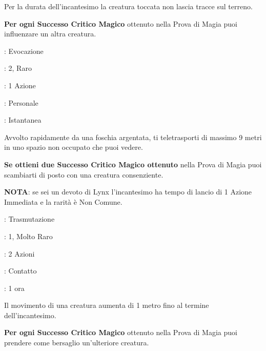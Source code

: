 \begin{multicols}{2}
Per la durata dell'incantesimo la creatura toccata non lascia tracce sul terreno.

\textbf{Per ogni Successo Critico Magico} ottenuto nella Prova di Magia puoi influenzare un altra creatura.

\noindent\colorbox{OBSSgold!10}{
\begin{minipage}{0.95\linewidth}
\begin{description}[noitemsep, topsep=0pt, parsep=0pt, partopsep=0pt, leftmargin=0cm, labelwidth=1.3cm]
	\item[\textbf{Lista}]: Evocazione
	\item[\textbf{Livello}]: 2, Raro
	\item[\textbf{Lancio}]: 1 Azione
	\item[\textbf{Gittata}]: Personale
	\item[\textbf{Durata}]: Istantanea
\end{description}
\end{minipage}}\smallskip

Avvolto rapidamente da una foschia argentata, ti teletrasporti di massimo 9 metri in uno spazio non occupato che puoi vedere.

\textbf{Se ottieni due Successo Critico Magico ottenuto} nella Prova di Magia puoi scambiarti di posto con una creatura consenziente.

\textbf{NOTA}: se sei un devoto di Lynx l'incantesimo ha tempo di lancio di 1 Azione Immediata e la rarità è Non Comune.

\noindent\colorbox{OBSSgold!10}{
\begin{minipage}{0.95\linewidth}
\begin{description}[noitemsep, topsep=0pt, parsep=0pt, partopsep=0pt, leftmargin=0cm, labelwidth=1.3cm]
	\item[\textbf{Lista}]: Trasmutazione
	\item[\textbf{Livello}]: 1, Molto Raro
	\item[\textbf{Lancio}]: 2 Azioni
	\item[\textbf{Gittata}]: Contatto
	\item[\textbf{Durata}]: 1 ora
\end{description}
\end{minipage}}\smallskip

Il movimento di una creatura aumenta di 1 metro fino al termine dell'incantesimo.

\textbf{Per ogni Successo Critico Magico} ottenuto nella Prova di Magia puoi prendere come bersaglio un'ulteriore creatura.


\end{multicols}
